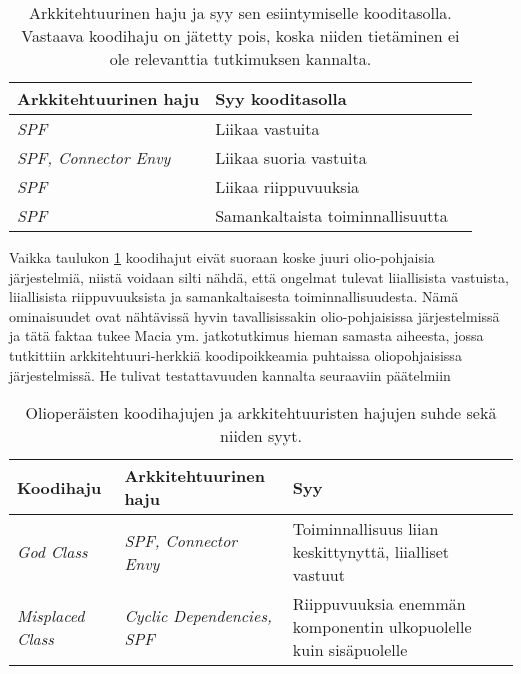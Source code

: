 \documentclass[finnish]{tktltiki2}
\numberwithin{table}{section}
\theoremstyle{definition}
\theoremstyle{remark}
\begin{document}


\begin{table}[ht]
	\centering
	\begin{tabular}{| l | l | m{3.2cm} |}
	\hline 
	\textbf{Arkkitehtuurinen haju} & \textbf{Syy kooditasolla} \\ \hline
	\textit{SPF} & Liikaa vastuita \\ \hline
	\textit{SPF, Connector Envy} & Liikaa suoria vastuita \\ \hline
	\textit{SPF} & Liikaa riippuvuuksia \\ \hline
	\textit{SPF} & Samankaltaista toiminnallisuutta \\ 
	\hline
	\end{tabular}
	\caption{Arkkitehtuurinen haju ja syy sen esiintymiselle kooditasolla. Vastaava koodihaju on jätetty pois, koska niiden tietäminen ei ole relevanttia tutkimuksen kannalta.}
	\label{tab:aspectSmells} 
\end{table}



\noindent
Vaikka taulukon \ref{tab:aspectSmells} koodihajut eivät suoraan koske juuri olio-pohjaisia järjestelmiä, niistä voidaan silti nähdä, että ongelmat tulevat liiallisista vastuista, liiallisista riippuvuuksista ja samankaltaisesta toiminnallisuudesta. Nämä ominaisuudet ovat nähtävissä hyvin tavallisissakin olio-pohjaisissa järjestelmissä ja tätä faktaa tukee Macia ym. jatkotutkimus hieman samasta aiheesta, jossa tutkittiin arkkitehtuuri-herkkiä koodipoikkeamia puhtaissa oliopohjaisissa järjestelmissä. He tulivat testattavuuden kannalta seuraaviin päätelmiin \citep{macia_enhancing_2013}



\begin{table}[h]
	\centering
	\begin{tabular}{| l | l | m{3.5cm} |}
	\hline
	\textbf{Koodihaju} & \textbf{Arkkitehtuurinen haju} & \textbf{Syy}\\ \hline
	\textit{God Class} & \textit{SPF, Connector Envy} &  Toiminnallisuus liian keskittynyttä, liialliset vastuut\\ \hline
	\textit{Misplaced Class} & \textit{Cyclic Dependencies, SPF} & Riippuvuuksia enemmän komponentin ulkopuolelle kuin sisäpuolelle\\ \hline
	\end{tabular}
	\caption{Olioperäisten koodihajujen ja arkkitehtuuristen hajujen suhde sekä niiden syyt.}
	\label{tab:codeSmells}
\end{table}
\end{document}
